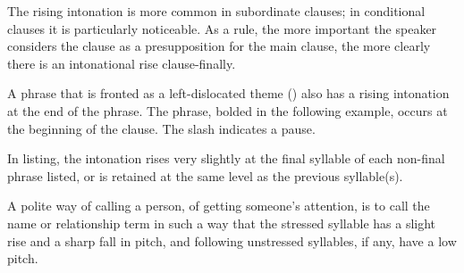 The rising intonation is more common in subordinate clauses; in conditional clauses  it is particularly noticeable.  As a rule, the more important the speaker considers the clause as a presupposition for the main clause, the more clearly there is an intonational rise clause-finally.  




A phrase that is fronted as a left-dislocated theme () also has a rising intonation at the end of the phrase.  The phrase, bolded in the following example, occurs at the beginning of the clause.  The slash indicates a pause.

 

  
In listing, the intonation rises very slightly at the final syllable of each non-final phrase listed, or is retained at the same level as the previous syllable(s).


 

A polite way of calling a person, of getting someone's attention, is to call the name or relationship term in such a way that the stressed syllable has a slight rise and a sharp fall in pitch, and following unstressed syllables, if any, have a low pitch.



